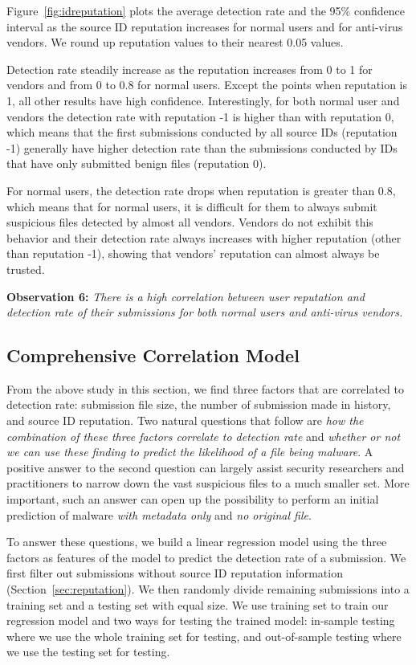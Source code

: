 Figure~\ref{fig:idreputation} plots the average detection rate and the 95\% confidence interval 
as the source ID reputation increases for normal users and for anti-virus vendors.
We round up reputation values to their nearest 0.05 values. 

Detection rate steadily increase as the reputation increases from 0 to 1 for vendors and from 0 to 0.8 for normal users.
Except the points when reputation is 1, all other results have high confidence.
Interestingly, for both normal user and vendors the detection rate with reputation -1 is higher than with reputation 0,
which means that the first submissions conducted by all source IDs (reputation -1) 
generally have higher detection rate than 
the submissions conducted by IDs that have only submitted benign files (reputation 0).

For normal users, the detection rate drops when reputation is greater than 0.8,
which means that for normal users, it is difficult for them to always submit suspicious files detected by almost all vendors.
Vendors do not exhibit this behavior and their detection rate always increases with higher reputation (other than reputation -1),
showing that vendors' reputation can almost always be trusted.


{\bf Observation 6:} 
{\em There is a high correlation between user reputation and detection rate of their submissions for both normal users and anti-virus vendors.}


\subsection{Comprehensive Correlation Model}

From the above study in this section, we find three factors that are correlated to detection rate: 
submission file size, the number of submission made in history, and source ID reputation.
Two natural questions that follow are {\em how the combination of these three factors correlate to detection rate} and 
{\em whether or not we can use these finding to predict the likelihood of a file being malware}.
A positive answer to the second question can largely assist security researchers and practitioners to narrow down 
the vast suspicious files to a much smaller set.
More important, such an answer can open up the possibility to perform an initial prediction of malware {\em with metadata only} and 
{\em no original file}.

To answer these questions, we build a linear regression model using the three factors as features of the model 
to predict the detection rate of a submission.   
We first filter out submissions without source ID reputation information (Section~\ref{sec:reputation}). 
We then randomly divide remaining submissions into a training set and a testing set with equal size. 
We use training set to train our regression model and two ways for testing the trained model:
in-sample testing where we use the whole training set for testing, and out-of-sample testing where we use the testing set for testing. 

